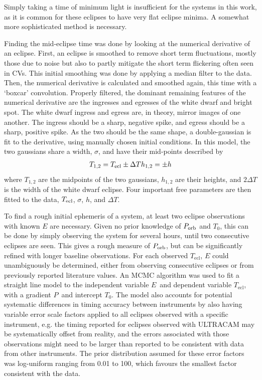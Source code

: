 Simply taking a time of minimum light is insufficient for the systems in this work, as it is common for these eclipses to have very flat eclipse minima. A somewhat more sophisticated method is necessary.

Finding the mid-eclipse time was done by looking at the numerical derivative of an eclipse. 
First, an eclipse is smoothed to remove short term fluctuations, mostly those due to noise but also to partly mitigate the short term flickering often seen in CVs. This initial smoothing was done by applying a median filter to the data. Then, the numerical derivative is calculated and smoothed again, this time with a `boxcar' convolution. Properly filtered, the dominant remaining features of the numerical derivative are the ingresses and egresses of the white dwarf and bright spot. 
The white dwarf ingress and egress are, in theory, mirror images of one another. The ingress should be a sharp, negative spike, and egress should be a sharp, positive spike. As the two should be the same shape, a double-gaussian is fit to the derivative, using manually chosen initial conditions. In this model, the two gaussians share a width, $\sigma$, and have their mid-points described by
\begin{align*}
    T_{\rm 1,2} = T_{\rm ecl} \pm \Delta T
    h_{\rm 1,2} = \pm h
\end{align*}
where $T_{1,2}$ are the midpoints of the two gaussians, $h_{1,2}$ are their heights, and $2\Delta T$ is the width of the white dwarf eclipse. Four important free parameters are then fitted to the data, $T_{\rm ecl}$, $\sigma$, $h$, and $\Delta T$. 

To find a rough initial ephemeris of a system, at least two eclipse observations with known $E$ are necessary. Given no prior knowledge of $P_{\rm orb}$ and $T_0$, this can be done by simply observing the system for several hours, until two consecutive eclipses are seen. This gives a rough measure of $P_{\rm orb}$, but can be significantly refined with longer baseline observations. 
For each observed $T_\mathrm{ecl}$, $E$ could unambiguously be determined, either from observing consecutive eclipses or from previously reported literature values.
An MCMC algorithm was used to fit a straight line model to the independent variable $E$\ and dependent variable $T_\mathrm{ecl}$, with a gradient $P$\ and intercept $T_0$. 
The model also accounts for potential systematic differences in timing accuracy between instruments by also having variable error scale factors applied to all eclipses observed with a specific instrument, e.g. the timing reported for eclipses observed with ULTRACAM may be systematically offset from reality, and the errors associated with those observations might need to be larger than reported to be consistent with data from other instruments. The prior distribution assumed for these error factors was log-uniform ranging from 0.01 to 100, which favours the smallest factor consistent with the data. 

